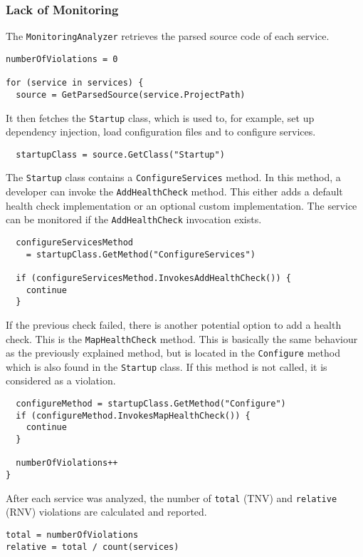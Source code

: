\documentclass{article}
\begin{document}
\subsubsection{Lack of Monitoring}
The \lstinline{MonitoringAnalyzer} retrieves the parsed source code of each service.
\begin{lstlisting}
numberOfViolations = 0

for (service in services) {
  source = GetParsedSource(service.ProjectPath)
\end{lstlisting}
It then fetches the \lstinline{Startup} class, which is used to, for example, set up dependency injection, load configuration files and to configure services.
\begin{lstlisting}
  startupClass = source.GetClass("Startup")
\end{lstlisting}
The \lstinline{Startup} class contains a \lstinline{ConfigureServices} method. In this method, a developer can invoke the \lstinline{AddHealthCheck} method. This either adds a default health check implementation or an optional custom implementation. The service can be monitored if the \lstinline{AddHealthCheck} invocation exists.
\begin{lstlisting}
  configureServicesMethod
    = startupClass.GetMethod("ConfigureServices")
    
  if (configureServicesMethod.InvokesAddHealthCheck()) {
    continue
  }
\end{lstlisting}
If the previous check failed, there is another potential option to add a health check. This is the \lstinline{MapHealthCheck} method. This is basically the same behaviour as the previously explained method, but is located in the \lstinline{Configure} method which is also found in the \lstinline{Startup} class. If this method is not called, it is considered as a violation.
\begin{lstlisting}
  configureMethod = startupClass.GetMethod("Configure")
  if (configureMethod.InvokesMapHealthCheck()) {
    continue
  }

  numberOfViolations++
}
\end{lstlisting}
After each service was analyzed, the number of \lstinline{total} (TNV) and \lstinline{relative} (RNV) violations are calculated and reported.
\begin{lstlisting}
total = numberOfViolations
relative = total / count(services)
\end{lstlisting}
\end{document}
